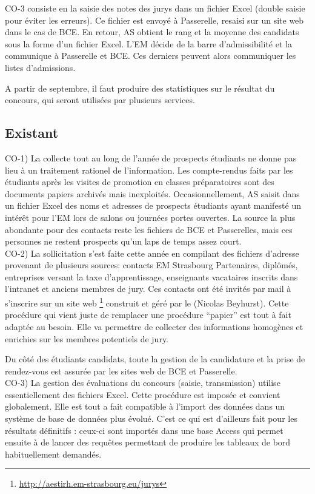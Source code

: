 \documentclass{book}
\begin{document}
CO-3 consiste en la saisie des notes des jurys dans un fichier
Excel (double saisie pour éviter les erreurs). Ce fichier est 
envoyé à Passerelle, resaisi sur un site web dans le cas de BCE.
En retour, AS obtient le rang et la moyenne des candidats sous
la forme d'un fichier Excel. L'EM décide de la barre d'admissibilité
et la communique à Passerelle et BCE. Ces derniers peuvent alors
communiquer les listes d'admissions.

A partir de septembre, il faut produire des statistiques sur le
résultat du concours, qui seront utilisées par plusieurs services.


\subsection{Existant}
CO-1) 
La collecte tout au long de l'année de prospects étudiants
ne donne pas lieu à un traitement rationel de l'information.
Les compte-rendus faits par les étudiants après les visites de
promotion en classes préparatoires sont des documents papiers
archivés mais inexploités. Occasionnellement, AS saisit dans un
fichier Excel des noms et adresses de prospects étudiants ayant 
manifesté un intérêt pour l'EM lors de salons ou journées portes 
ouvertes. La source la plus abondante pour des contacts reste
les fichiers de BCE et Passerelles, mais ces personnes ne restent
prospects qu'un laps de temps assez court.\\


CO-2)
La sollicitation s'est faite cette année en compilant des
fichiers d'adresse provenant de plusieurs sources: contacts
EM Strasbourg Partenaires, diplômés, entreprises versant la
taxe d'apprentissage, enseignants vacataires inscrits dans
l'intranet et anciens membres de jury. Ces contacts ont été
invités par mail à s'inscrire sur un site web%
\footnote{\url{http://aestirh.em-strasbourg.eu/jurys}}
construit et géré par le \scom (Nicolas Beyhurst).
Cette procédure qui vient juste de remplacer une procédure
``papier'' est tout à fait adaptée au besoin. Elle va permettre
de collecter des informations homogènes et enrichies sur les
membres potentiels de jury.

Du côté des étudiants candidats, toute la gestion de la 
candidature et la prise de rendez-vous est assurée par 
les sites web de BCE et Passerelle.\\

CO-3) 
La gestion des évaluations du concours (saisie, transmission)
utilise essentiellement des fichiers Excel. Cette procédure
est imposée et convient globalement. Elle est tout a fait 
compatible à l'import des données dans un système de base de
données plus évolué.
C'est ce qui est d'ailleurs fait pour les résultats définitifs :
ceux-ci sont importés dans une base Access qui permet ensuite
à \CK de lancer des requêtes permettant de produire les tableaux
de bord habituellement demandés. 
\end{document}
